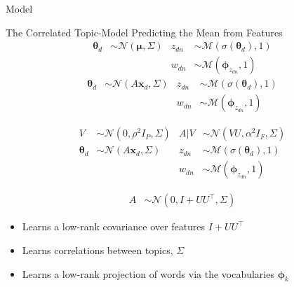 \documentclass[xcolor=dvipsnames]{beamer}
\newcommand \T { ^\top }
\newcommand \vv[1] { \boldsymbol #1 }
\newcommand \thd[0]  { { \vv \theta_d } }
\newcommand \xd      { { \vv x_d } }
\newcommand \nor[2]   { \mathcal{N} \left( {#1}, {#2} \right) }
\newcommand \mnor[3]  { \mathcal{N} \left(#1, #2, #3\right) }
\newcommand \muln[2]  { \mathcal{M} \left( {#1},{#2} \right) }
\begin{document}
\begin{frame}{Model}

 { The Correlated Topic-Model }
 { Predicting the Mean from Features}
 {
    \begin{align*}
    \vv{\theta}_d & \sim \nor{\vv{\mu}}{\Sigma} & z_{dn} & \sim \muln{\sigma(\thd)}{1} \\
    & & w_{dn} & \sim \muln{\vv{\phi}_{z_{dn}}}{1} 
    \end{align*}
}
 {
    \begin{align*}
    \vv{\theta}_d & \sim \nor{A\xd}{\Sigma} & z_{dn} & \sim \muln{\sigma(\thd)}{1} \\
    & & w_{dn} & \sim \muln{\vv{\phi}_{z_{dn}}}{1} 
    \end{align*}
}

 {
    \begin{align*}
    V & \sim \mnor{0}{\rho^2 I_P}{\Sigma} & A|V & \sim \mnor{VU}{\alpha^2 I_F}{\Sigma} \\
    \vv{\theta}_d & \sim \nor{A\xd}{\Sigma} & z_{dn} & \sim \muln{\sigma(\thd)}{1} \\
    & & w_{dn} & \sim \muln{\vv{\phi}_{z_{dn}}}{1} 
    \end{align*}
}

 {
    \begin{align*}
    A & \sim \mnor{0}{I + UU\T}{\Sigma} 
    \end{align*}
}

 {
    \begin{itemize}
        \item Learns a low-rank covariance over features $I + UU\T$
        \item Learns correlations between topics, $\Sigma$
        \item Learns a low-rank projection of words via the vocabularies $\vv{\phi}_k$
    \end{itemize}
}

\end{frame}
\end{document}
